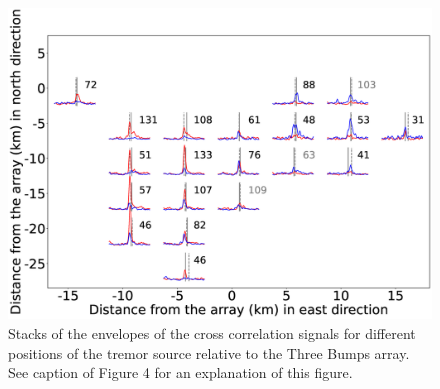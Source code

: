 \documentclass[draft]{agujournal2019}
\begin{document}
\begin{figure}
\noindent\includegraphics[width=\textwidth, trim={2.5cm 0.5cm 5cm 1.5cm},clip]{figures/TB_PWS_PWS_0.eps}
\caption{Stacks of the envelopes of the cross correlation signals for different positions of the tremor source relative to the Three Bumps array. See caption of Figure 4 for an explanation of this figure.}
\label{pngfiguresample}
\end{figure}
\end{document}
